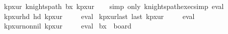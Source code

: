 \begin{isabellebody}
\isamarkupfalse%
\ kp{\isacharunderscore}{\kern0pt}{}x{}{\isacharunderscore}{\kern0pt}ur{\isacharcolon}{\kern0pt}\ {\isachardoublequoteopen}knights{\isacharunderscore}{\kern0pt}path\ b{}x{}\ kp{}x{}ur{\isachardoublequoteclose}\isanewline
%
\isadelimproof
\ \ %
\endisadelimproof
%
\isatagproof
{}\isamarkupfalse%
\ {\isacharparenleft}{\kern0pt}simp\ only{\isacharcolon}{\kern0pt}\ knights{\isacharunderscore}{\kern0pt}path{\isacharunderscore}{\kern0pt}exec{\isacharunderscore}{\kern0pt}simp{\isacharparenright}{\kern0pt}\ eval%
\endisatagproof
{\isafoldproof}%
%
\isadelimproof
\isanewline
%
\endisadelimproof
\isanewline
{}\isamarkupfalse%
\ kp{\isacharunderscore}{\kern0pt}{}x{}{\isacharunderscore}{\kern0pt}ur{\isacharunderscore}{\kern0pt}hd{\isacharcolon}{\kern0pt}\ {\isachardoublequoteopen}hd\ kp{}x{}ur\ {\isacharequal}{\kern0pt}\ {\isacharparenleft}{\kern0pt}{}{\isacharcomma}{\kern0pt}{}{\isacharparenright}{\kern0pt}{\isachardoublequoteclose}%
\isadelimproof
\ %
\endisadelimproof
%
\isatagproof
{}\isamarkupfalse%
\ eval%
\endisatagproof
{\isafoldproof}%
%
\isadelimproof
%
\endisadelimproof
\isanewline
\isanewline
{}\isamarkupfalse%
\ kp{\isacharunderscore}{\kern0pt}{}x{}{\isacharunderscore}{\kern0pt}ur{\isacharunderscore}{\kern0pt}last{\isacharcolon}{\kern0pt}\ {\isachardoublequoteopen}last\ kp{}x{}ur\ {\isacharequal}{\kern0pt}\ {\isacharparenleft}{\kern0pt}{}{\isacharcomma}{\kern0pt}{}{\isacharparenright}{\kern0pt}{\isachardoublequoteclose}%
\isadelimproof
\ %
\endisadelimproof
%
\isatagproof
{}\isamarkupfalse%
\ eval%
\endisatagproof
{\isafoldproof}%
%
\isadelimproof
%
\endisadelimproof
\isanewline
\isanewline
{}\isamarkupfalse%
\ kp{\isacharunderscore}{\kern0pt}{}x{}{\isacharunderscore}{\kern0pt}ur{\isacharunderscore}{\kern0pt}non{\isacharunderscore}{\kern0pt}nil{\isacharcolon}{\kern0pt}\ {\isachardoublequoteopen}kp{}x{}ur\ {\isasymnoteq}\ {\isacharbrackleft}{\kern0pt}{\isacharbrackright}{\kern0pt}{\isachardoublequoteclose}%
\isadelimproof
\ %
\endisadelimproof
%
\isatagproof
{}\isamarkupfalse%
\ eval%
\endisatagproof
{\isafoldproof}%
%
\isadelimproof
%
\endisadelimproof
\isanewline
\isanewline
{}\isamarkupfalse%
\ {\isachardoublequoteopen}b{}x{}\ {\isasymequiv}\ board\ {}\ {}{\isachardoublequoteclose}%

\end{isabellebody}
